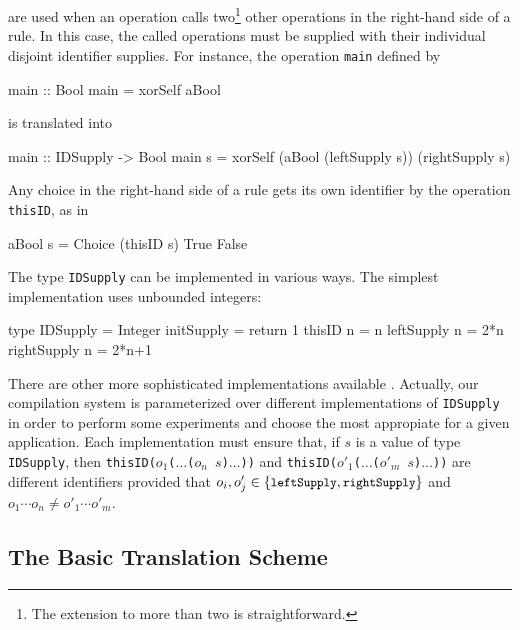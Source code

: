 \documentclass{llncs}
\newcommand{\code}[1]{\mbox{\small\texttt{#1}}}
\begin{document}
are used when an operation calls two\footnote{The
extension to more than two is straightforward.}
other operations in the right-hand side of a rule. In this case,
the called operations must be supplied with their individual disjoint
identifier supplies. For instance, the operation \code{main}
defined by
\label{sec:xor-main}
\begin{curry}
  main :: Bool
  main = xorSelf aBool
\end{curry}
is translated into
\begin{haskell}
  main :: IDSupply -> Bool
  main s = xorSelf (aBool (leftSupply s)) (rightSupply s)
\end{haskell}
Any choice in the right-hand side of a rule gets its own identifier
by the operation \code{thisID}, as in
\begin{haskell}
  aBool s = Choice (thisID s) True False
\end{haskell}
The type \code{IDSupply} can be implemented in various ways.
The simplest implementation uses unbounded integers:
\begin{haskell}
  type IDSupply = Integer
  initSupply    = return 1
  thisID      n = n
  leftSupply  n = 2*n
  rightSupply n = 2*n+1
\end{haskell}
There are other more sophisticated implementations available
\cite{AugustssonRittriSynek94}.
Actually, our compilation system is parameterized over different
implementations of \code{IDSupply}
in order to perform some experiments and choose
the most appropiate for a given application.
Each implementation must ensure that, if $s$ is a value of type
\code{IDSupply}, then \code{thisID($o_1$($\ldots$($o_n$ $s$)$\ldots$))}
and \code{thisID($o'_1$($\ldots$($o'_m$ $s$)$\ldots$))}
are different identifiers provided that
$o_i,o'_j \in \{\code{leftSupply},\code{rightSupply}\}$
and $o_1\cdots o_n \neq o'_1\cdots o'_m$.

\subsection{The Basic Translation Scheme}
\end{document}
